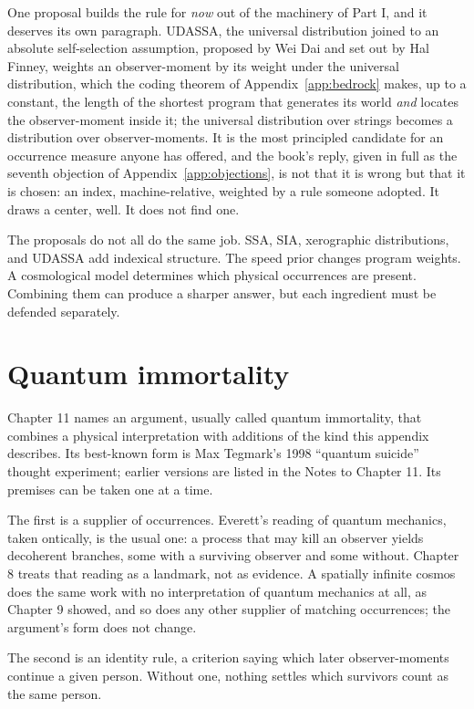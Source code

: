 One proposal builds the rule for \emph{now} out of the machinery of Part I, and it deserves its own paragraph. UDASSA, the universal distribution joined to an absolute self-selection assumption, proposed by Wei Dai and set out by Hal Finney, weights an observer-moment by its weight under the universal distribution, which the coding theorem of Appendix~\ref{app:bedrock} makes, up to a constant, the length of the shortest program that generates its world \emph{and} locates the observer-moment inside it; the universal distribution over strings becomes a distribution over observer-moments. It is the most principled candidate for an occurrence measure anyone has offered, and the book's reply, given in full as the seventh objection of Appendix~\ref{app:objections}, is not that it is wrong but that it is chosen: an index, machine-relative, weighted by a rule someone adopted. It draws a center, well. It does not find one.

The proposals do not all do the same job. SSA, SIA, xerographic distributions, and UDASSA add indexical structure. The speed prior changes program weights. A cosmological model determines which physical occurrences are present. Combining them can produce a sharper answer, but each ingredient must be defended separately.

\section*{Quantum immortality}

Chapter 11 names an argument, usually called quantum immortality, that combines a physical interpretation with additions of the kind this appendix describes. Its best-known form is Max Tegmark's 1998 ``quantum suicide'' thought experiment; earlier versions are listed in the Notes to Chapter 11. Its premises can be taken one at a time.

The first is a supplier of occurrences. Everett's reading of quantum mechanics, taken ontically, is the usual one: a process that may kill an observer yields decoherent branches, some with a surviving observer and some without. Chapter 8 treats that reading as a landmark, not as evidence. A spatially infinite cosmos does the same work with no interpretation of quantum mechanics at all, as Chapter 9 showed, and so does any other supplier of matching occurrences; the argument's form does not change.

The second is an identity rule, a criterion saying which later observer-moments continue a given person. Without one, nothing settles which survivors count as the same person.

